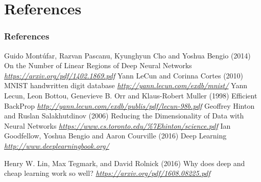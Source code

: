 \section{References}

\begin{vbframe}
\frametitle{References}
\footnotesize{
\begin{thebibliography}{99}
 Guido Mont\'{u}far, Razvan Pascanu, Kyunghyun Cho and Yoshua Bengio (2014)
\newblock On the Number of Linear Regions of Deep Neural Networks
\newblock \emph{\url{https://arxiv.org/pdf/1402.1869.pdf}}
 Yann LeCun and Corinna Cortes (2010)
\newblock MNIST handwritten digit database 
\newblock \emph{\url{http://yann.lecun.com/exdb/mnist/}}
 Yann Lecun, Leon Bottou, Genevieve B. Orr and Klaus-Robert Muller (1998)
\newblock Efficient BackProp
\newblock \emph{\url{http://yann.lecun.com/exdb/publis/pdf/lecun-98b.pdf}}
 Geoffrey Hinton and Ruslan Salakhutdinov (2006)
\newblock Reducing the Dimensionality of Data with Neural Networks
\newblock \emph{\url{https://www.cs.toronto.edu/\%7Ehinton/science.pdf}}
 Ian Goodfellow, Yoshua Bengio and Aaron Courville (2016)
\newblock Deep Learning
\newblock \emph{\url{http://www.deeplearningbook.org/}}

 Henry W. Lin, Max Tegmark, and David Rolnick (2016)
\newblock Why does deep and cheap learning work so well?
\newblock \emph{\url{https://arxiv.org/pdf/1608.08225.pdf}}
\end{thebibliography}
}
\end{vbframe}




\endlecture

